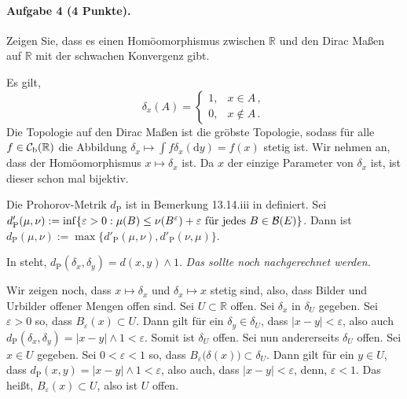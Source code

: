 \documentclass{article}
\begin{document}
\paragraph{Aufgabe 4 \textnormal{(4 Punkte)}.}
Zeigen Sie, dass es einen Homöomorphismus zwischen $\mathbb{R}$ und den Dirac Maßen auf $\mathbb{R}$ mit der schwachen Konvergenz gibt.

Es gilt,
\[
\delta_x(A)=
\begin{cases}
  1,&x\in A\,,\\
  0,&x\notin A\,.
\end{cases}
\]
Die Topologie auf den Dirac Maßen ist die gröbste Topologie, sodass für alle $f\in{\cal C}_\mathrm{b}(\mathbb{R})$ die Abbildung $\delta_x\mapsto\int f\delta_x(\mathrm{d}y)=f(x)$ stetig ist.
Wir nehmen an, dass der Homöomorphismus $x\mapsto\delta_x$ ist.
Da $x$ der einzige Parameter von $\delta_x$ ist, ist dieser schon mal bijektiv.

Die Prohorov-Metrik $d_\mathrm{P}$ ist in Bemerkung 13.14.iii in \cite{klenke} definiert.
Sei $d'_\mathrm{P}(\mu,\nu):=\inf\{\varepsilon>0:\mu(B)\leq\nu(B^\varepsilon)+\varepsilon\text{ für jedes }B\in{\cal B}(E)\}$.
Dann ist $d_\mathrm{P}(\mu,\nu):=\max\{d'_\mathrm{P}(\mu,\nu),d'_\mathrm{P}(\nu,\mu)\}$.

In \cite{4438264} steht, $d_\mathrm{P}(\delta_x,\delta_y)=d(x,y)\wedge1$.
\emph{Das sollte noch nachgerechnet werden.}

Wir zeigen noch, dass $x\mapsto\delta_x$ und $\delta_x\mapsto x$ stetig sind, also, dass Bilder und Urbilder offener Mengen offen sind.
Sei $U\subset\mathbb{R}$ offen.
Sei $\delta_x$ in $\delta_U$ gegeben.
Sei $\varepsilon>0$ so, dass $B_\varepsilon(x)\subset U$.
Dann gilt für ein $\delta_y\in \delta_U$, dass $|x-y|<\varepsilon$, also auch $d_\mathrm{P}(\delta_x,\delta_y)=|x-y|\wedge1<\varepsilon$.
Somit ist $\delta_U$ offen.
Sei nun andererseits $\delta_U$ offen.
Sei $x\in U$ gegeben.
Sei $0<\varepsilon<1$ so, dass $B_\varepsilon\bigl(\delta(x)\bigr)\subset \delta_U$.
Dann gilt für ein $y\in U$, dass $d_\mathrm{P}(x,y)=|x-y|\wedge1<\varepsilon$, also auch, dass $|x-y|<\varepsilon$, denn, $\varepsilon<1$.
Das heißt, $B_\varepsilon(x)\subset U$, also ist $U$ offen.


\end{document}

